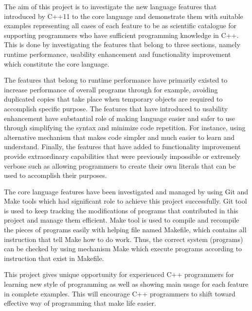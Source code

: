 \documentclass[11pt]{report}
\begin{document}
The aim  of this project is to investigate the new language features that introduced by C++11 to the core language and demonstrate them with suitable examples representing all cases of each feature to be as scientific catalogue for supporting programmers who have sufficient programming knowledge in C++.  This is done by investigating the features that belong to three sections, namely runtime performance, usability enhancement and functionality improvement which constitute the core language.

The features that belong to runtime performance have primarily existed to increase performance of overall programs through for example, avoiding duplicated copies that take place when temporary objects are required to accomplish specific purpose. The features that have introduced to usability enhancement have substantial role of making language easier and safer to use through simplifying the syntax and minimize code repetition. For instance, using alternative mechanism that makes code simpler and much easier to learn and understand. Finally, the features that have added to functionality improvement provide extraordinary capabilities that were previously impossible or extremely verbose such as allowing programmers to create their own literals that can be used to accomplish their purposes. 

The core language features have been investigated and managed by using Git and Make tools which had significant role to achieve this project successfully. Git tool is used to keep tracking the modifications of programs that contributed in this project and manage them efficient. Make tool is used to compile and recompile the pieces of programs easily with helping file named Makefile, which contains all instruction that tell Make how to do work. Thus, the correct system (programs) can be checked by using mechanism Make which execute programs according to instruction that exist in Makefile.

This project gives unique opportunity for experienced C++ programmers for learning new style of programming as well as showing main usage for each feature in complete examples. This will encourage C++ programmers to shift toward effective way of programming that make life easier.
\end{document}
